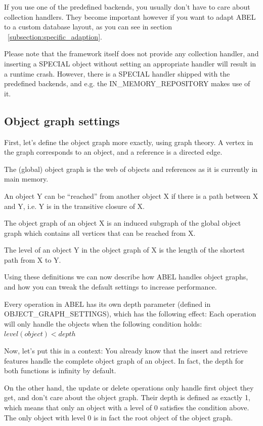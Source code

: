 

If you use one of the predefined backends, you usually don't have to care about collection handlers.
They become important however if you want to adapt ABEL to a custom database layout, as you can see in section ~\ref{subsection:specific_adaption}.

Please note that the framework itself does not provide any collection handler, and inserting a SPECIAL object without setting an appropriate handler will result in a runtime crash.
However, there is a SPECIAL handler shipped with the predefined backends, and e.g. the IN\_MEMORY\_REPOSITORY makes use of it.

\subsection{Object graph settings}

First, let's define the object graph more exactly, using graph theory.
A vertex in the graph corresponds to an object, and a reference is a directed edge.

The (global) object graph is the web of objects and references as it is currently in main memory.

An object Y can be ``reached'' from another object X if there is a path between X and Y, i.e. Y is in the transitive closure of X.

The object graph of an object X is an induced subgraph of the global object graph which contains all vertices that can be reached from X.

The level of an object Y in the object graph of X is the length of the shortest path from X to Y.

Using these definitions we can now describe how ABEL handles object graphs, and how you can tweak the default settings to increase performance.

Every operation in ABEL has its own depth parameter (defined in OBJECT\_GRAPH\_SETTINGS), which has the following effect:
Each operation will only handle the objects when the following condition holds: $ level(object) < depth $

Now, let's put this in a context:
You already know that the insert and retrieve features handle the complete object graph of an object. 
In fact, the depth for both functions is infinity by default.

On the other hand, the update or delete operations only handle first object they get, and don't care about the object graph.
Their depth is defined as exactly 1, which means that only an object with a level of 0 satisfies the condition above.
The only object with level 0 is in fact the root object of the object graph.

